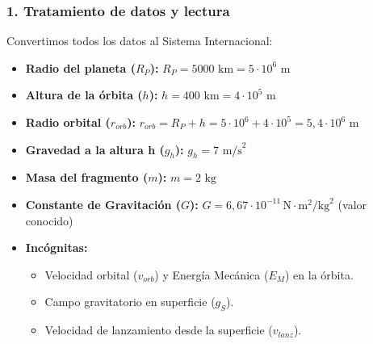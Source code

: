 \subsubsection*{1. Tratamiento de datos y lectura}
Convertimos todos los datos al Sistema Internacional:
\begin{itemize}
    \item \textbf{Radio del planeta ($R_P$):} $R_P = 5000 \text{ km} = 5 \cdot 10^6 \text{ m}$
    \item \textbf{Altura de la órbita ($h$):} $h = 400 \text{ km} = 4 \cdot 10^5 \text{ m}$
    \item \textbf{Radio orbital ($r_{orb}$):} $r_{orb} = R_P + h = 5 \cdot 10^6 + 4 \cdot 10^5 = 5,4 \cdot 10^6 \text{ m}$
    \item \textbf{Gravedad a la altura h ($g_h$):} $g_h = 7 \text{ m/s}^2$
    \item \textbf{Masa del fragmento ($m$):} $m = 2 \text{ kg}$
    \item \textbf{Constante de Gravitación ($G$):} $G = 6,67 \cdot 10^{-11} \, \text{N}\cdot\text{m}^2/\text{kg}^2$ (valor conocido)
    \item \textbf{Incógnitas:}
    \begin{itemize}
        \item Velocidad orbital ($v_{orb}$) y Energía Mecánica ($E_M$) en la órbita.
        \item Campo gravitatorio en superficie ($g_S$).
        \item Velocidad de lanzamiento desde la superficie ($v_{lanz}$).
    \end{itemize}
\end{itemize}

